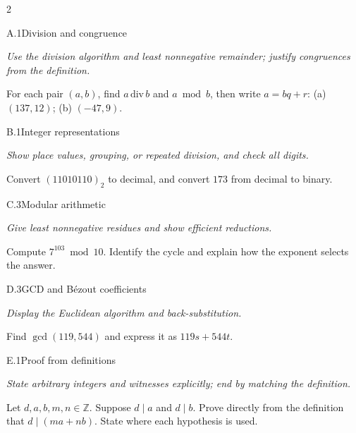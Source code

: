 \documentclass[9pt]{extarticle}
\begin{document}
\begin{multicols}{2}
\begin{CoreProblem}{A.1}{Division and congruence}
{\scriptsize\textit{Use the division algorithm and least nonnegative remainder; justify congruences from the definition.}\par}
For each pair $(a,b)$, find $a\,\mathrm{div}\,b$ and $a\bmod b$, then write
$a=bq+r$: (a) $(137,12)$; (b) $(-47,9)$.
\end{CoreProblem}
\begin{CoreProblem}{B.1}{Integer representations}
{\scriptsize\textit{Show place values, grouping, or repeated division, and check all digits.}\par}
Convert $(11010110)_2$ to decimal, and convert $173$ from decimal to binary.
\end{CoreProblem}
\begin{CoreProblem}{C.3}{Modular arithmetic}
{\scriptsize\textit{Give least nonnegative residues and show efficient reductions.}\par}
Compute $7^{103}\bmod10$. Identify the cycle and explain how the exponent
selects the answer.
\end{CoreProblem}
\columnbreak
\begin{CoreProblem}{D.3}{GCD and B\'ezout coefficients}
{\scriptsize\textit{Display the Euclidean algorithm and back-substitution.}\par}
Find $\gcd(119,544)$ and express it as $119s+544t$.
\end{CoreProblem}
\begin{CoreProblem}{E.1}{Proof from definitions}
{\scriptsize\textit{State arbitrary integers and witnesses explicitly; end by matching the definition.}\par}
Let $d,a,b,m,n\in\mathbb Z$. Suppose $d\mid a$ and $d\mid b$. Prove directly
from the definition that $d\mid(ma+nb)$. State where each hypothesis is used.
\end{CoreProblem}
\end{multicols}
\CoreWorkArea
\FormBreak
{}
\end{document}
